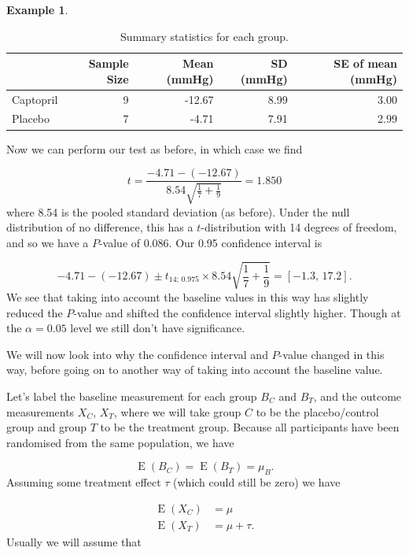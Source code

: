 \documentclass[
  openany]{book}
\theoremstyle{definition}
\theoremstyle{definition}
\newtheorem{example}{Example}[chapter]
\theoremstyle{definition}
\theoremstyle{definition}
\theoremstyle{remark}
\begin{document}
\begin{example}
\begin{table}

\caption{\label{tab:captoprildiffsumm}Summary statistics for each group.}
\centering
\begin{tabular}[t]{l|r|r|r|r}
\hline
  & Sample Size & Mean (mmHg) & SD (mmHg) & SE of mean (mmHg)\\
\hline
Captopril & 9 & -12.67 & 8.99 & 3.00\\
\hline
Placebo & 7 & -4.71 & 7.91 & 2.99\\
\hline
\end{tabular}
\end{table}

Now we can perform our test as before, in which case we find

\[ t = \frac{-4.71 - (-12.67)}{8.54\sqrt{\frac{1}{7}+\frac{1}{9}}} = 1.850 \]
where 8.54 is the pooled standard deviation (as before). Under the null distribution of no difference, this has a \(t\)-distribution with 14 degrees of freedom, and so we have a \(P\)-value of 0.086. Our 0.95 confidence interval is

\[ -4.71 - (-12.67) \pm t_{14;\,0.975}\times 8.54\sqrt{\frac{1}{7}+\frac{1}{9}} = \left[-1.3,\,17.2\right].\]
We see that taking into account the baseline values in this way has slightly reduced the \(P\)-value and shifted the confidence interval slightly higher. Though at the \(\alpha = 0.05\) level we still don't have significance.
\end{example}

We will now look into why the confidence interval and \(P\)-value changed in this way, before going on to another way of taking into account the baseline value.

Let's label the baseline measurement for each group \(B_C\) and \(B_T\), and the outcome measurements \(X_C,\,X_T\), where we will take group \(C\) to be the placebo/control group and group \(T\) to be the treatment group. Because all participants have been randomised from the same population, we have

\[\operatorname{E}\left(B_C\right) = \operatorname{E}\left(B_T\right) = \mu_B.\]
Assuming some treatment effect \(\tau\) (which could still be zero) we have

\[
\begin{aligned}
\operatorname{E}\left(X_C\right) & = \mu\\
\operatorname{E}\left(X_T\right) & = \mu + \tau.
\end{aligned}
\]
Usually we will assume that
\end{document}
